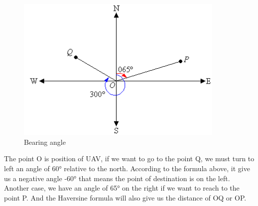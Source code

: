 \begin{figure}[!h] 
\begin{center}
\includegraphics[width=10cm]{imgs/img.png}
\caption{Bearing angle} 
\label{img1} 
\end{center}
\end{figure} 

The point O is position of UAV, if we want to go to the point Q, we must turn to left an angle of 60° relative to the north. According to the formula above, it give us a negative angle -60° that means the point of destination is on the left. Another case, we have an angle of 65° on the right if we want to reach to the point P.
And the Haversine formula will also give us the distance of OQ or OP.